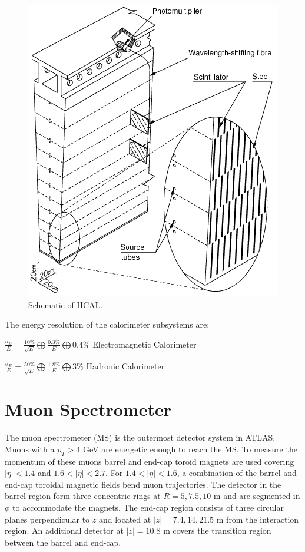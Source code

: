 \begin{figure}[h!]
  \centering
  \includegraphics[width=\hsize]{figures/Detector/hcal.png}
  \caption{Schematic of HCAL.} 
  \label{fig:hcal}
\end{figure}
\FloatBarrier


The energy resolution of the calorimeter subsystems are:

$\frac{\sigma_{E}}{E}=\frac{10\%}{\sqrt{E}}\bigoplus \frac{0.3\%}{E}\bigoplus 0.4\%$ Electromagnetic Calorimeter

$\frac{\sigma_{E}}{E}=\frac{50\%}{\sqrt{E}}\bigoplus \frac{1.8\%}{E}\bigoplus 3\%$ Hadronic Calorimeter


\section{Muon Spectrometer}
The muon spectrometer (MS) is the outermost detector system in ATLAS. Muons with a $p_{T}>4$ GeV are energetic enough to reach the MS. To measure the momentum of these muons barrel and end-cap toroid magnets are used covering $|\eta| < 1.4$ and $1.6<|\eta|<2.7$. For $1.4 < |\eta| < 1.6$, a combination of the barrel and end-cap toroidal magnetic fields bend muon trajectories. The detector in the barrel region form three concentric rings at $R=5, 7.5, 10$ m and are segmented in $\phi$ to accommodate the magnets. The end-cap region consists of three circular planes perpendicular to $z$ and located at $|z|=7.4, 14, 21.5$ m from the interaction region. An additional detector at $|z|=10.8$ m covers the transition region between the barrel and end-cap.

